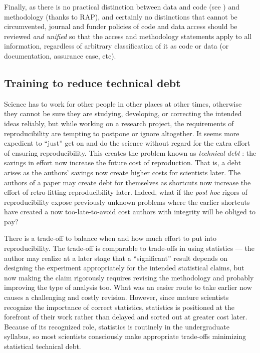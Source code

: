 \documentclass{comjnl}
\begin{document}
Finally, as there is no practical distinction between data and code (see \supplement) and methodology (thanks to RAP), and certainly no distinctions that cannot be circumvented, journal and funder policies of code and data access should be reviewed \emph{and unified\/} so that the access and methodology statements apply to all information, regardless of arbitrary classification of it as code or data (or documentation, assurance case, etc).

\subsection{Training to reduce technical debt}\label{technical-debt}
Science has to work for other people in other places at other times, otherwise they cannot be sure they are studying, developing, or correcting the intended ideas reliably, but while working on a research project, the requirements of reproducibility are tempting to postpone or ignore altogether. It seems more expedient to ``just'' get on and do the science without regard for the extra effort of ensuring reproducibility. This creates the problem known as \emph{technical debt} \cite{debt}: the savings in effort now increase the future cost of reproduction. That is, a debt arises as the authors' savings now create higher costs for scientists later. The authors of a paper may create debt for themselves as shortcuts now increase the effort of retro-fitting reproducibility later. Indeed, what if the \emph{post hoc\/} rigors of reproducibility expose previously unknown problems where the earlier shortcuts have created a now too-late-to-avoid cost authors with integrity will be obliged to pay?

There is a trade-off to balance when and how much effort to put into reproducibility. The trade-off is comparable to trade-offs in using statistics --- the author may realize at a later stage that a ``significant'' result depends on designing the experiment appropriately for the intended statistical claims, but now making the claim rigorously requires revising the methodology and probably improving the type of analysis too. What was an easier route to take earlier now causes a challenging and costly revision. However, since mature scientists recognize the importance of correct statistics, statistics is positioned at the forefront of their work rather than delayed and sorted out at greater cost later. Because of its recognized role, statistics is routinely in the undergraduate syllabus, so most scientists consciously make appropriate trade-offs minimizing statistical technical debt.
 
\end{document}
